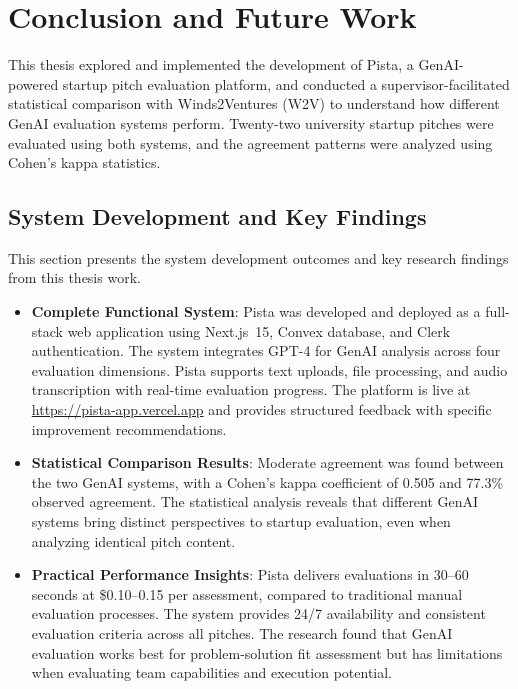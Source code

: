 \chapter{Conclusion and Future Work}
\label{ch:conclusion}

This thesis explored and implemented the development of Pista, a  GenAI-powered startup pitch evaluation platform, and conducted a supervisor-facilitated statistical comparison with Winds2Ventures (W2V) to understand how different GenAI evaluation systems perform. Twenty-two university startup pitches were evaluated using both systems, and the agreement patterns were analyzed using Cohen's kappa statistics.

\section{System Development and Key Findings}
\label{sec:accomplishments}

This section presents the system development outcomes and key research findings from this thesis work.

\begin{itemize}
  \item \textbf{Complete Functional System}: Pista was developed and deployed as a full-stack web application using Next.js~15, Convex database, and Clerk authentication. The system integrates GPT-4 for GenAI analysis across four evaluation dimensions. Pista supports text uploads, file processing, and audio transcription with real-time evaluation progress. The platform is live at \url{https://pista-app.vercel.app} and provides structured feedback with specific improvement recommendations.

  \item \textbf{Statistical Comparison Results}: Moderate agreement was found between the two GenAI systems, with a Cohen's kappa coefficient of 0.505 and 77.3\% observed agreement. The statistical analysis reveals that different GenAI systems bring distinct perspectives to startup evaluation, even when analyzing identical pitch content.

  \item \textbf{Practical Performance Insights}: Pista delivers evaluations in 30--60 seconds at \$0.10--0.15 per assessment, compared to traditional manual evaluation processes. The system provides 24/7 availability and consistent evaluation criteria across all pitches. The research found that GenAI evaluation works best for problem-solution fit assessment but has limitations when evaluating team capabilities and execution potential.
\end{itemize}


